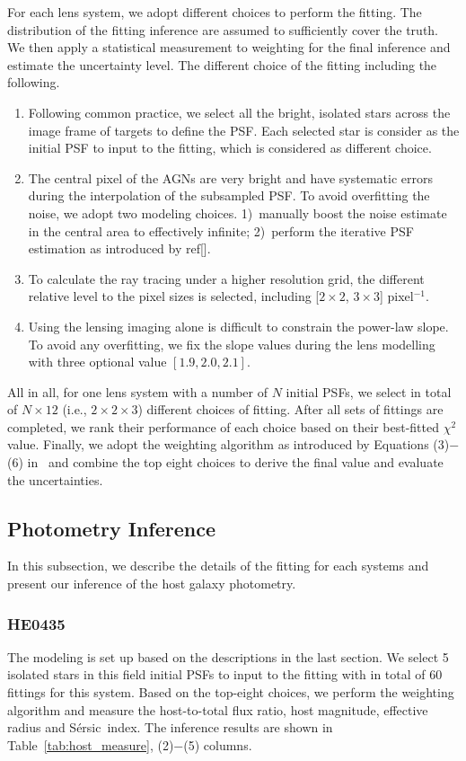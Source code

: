 \documentclass[fleqn,usenatbib]{mnras}
\newcommand{\sersic}{S\'ersic}
\begin{document}
For each lens system, we adopt different choices to perform the fitting. The distribution of the fitting inference are assumed to sufficiently cover the truth. We then apply a statistical measurement to weighting for the final inference and estimate the uncertainty level. The different choice of the fitting including the following.
\begin{enumerate}
\item Following common practice, we select all the bright, isolated stars across the image frame of targets to define the PSF. Each selected star is consider as the initial PSF to input to the fitting, which is considered as different choice.
\item The central pixel of the AGNs are very bright and have systematic errors during the interpolation of the subsampled PSF. To avoid overfitting the noise, we adopt two modeling choices. 1)~manually boost the noise estimate in the central area to effectively infinite; 2)~perform the iterative PSF estimation as introduced by ref[].
\item To calculate the ray tracing under a higher resolution grid, the different relative level to the pixel sizes is selected, including [$2\times2$, $3\times3$] pixel$^{-1}$.
\item Using the lensing imaging alone is difficult to constrain the power-law slope. To avoid any overfitting, we fix the slope values during the lens modelling with three optional value $[1.9, 2.0, 2.1]$.
\end{enumerate}

All in all, for one lens system with a number of $N$ initial PSFs, we select in total of $N\times12$ (i.e., $2 \times2 \times3$) different choices of fitting. After  all sets of fittings are completed, we rank their performance of each choice based on their best-fitted $\chi^2$ value. Finally, we adopt the weighting algorithm as introduced by Equations (3)$-$(6) in~\citet{Ding2020} and combine the top eight choices to derive the final value and evaluate the uncertainties.

\subsection{Photometry Inference}
In this subsection, we describe the details of the fitting for each systems and present our inference of the host galaxy photometry.

\subsubsection{HE0435}
The modeling is set up based on the descriptions in the last section. We select 5 isolated stars in this field initial PSFs to input to the fitting with in total of 60 fittings for this system. Based on the top-eight choices, we perform the weighting algorithm and measure the host-to-total flux ratio, host magnitude, effective radius and \sersic\ index. The inference results are shown in Table~\ref{tab:host_measure}, (2)$-$(5) columns.
\end{document}
